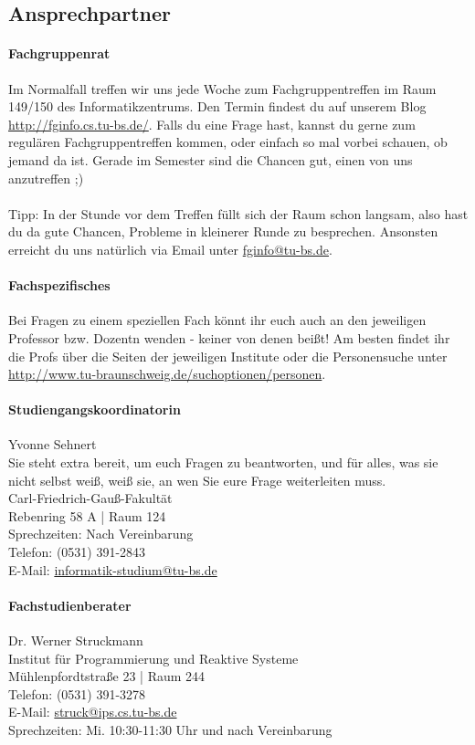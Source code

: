 \subsection{Ansprechpartner}
	\paragraph{Fachgruppenrat}
		Im Normalfall treffen wir uns jede Woche zum Fachgruppentreffen im Raum 149/150 des Informatikzentrums. Den  Termin findest du auf unserem Blog \url{http://fginfo.cs.tu-bs.de/}. Falls du eine Frage hast, kannst du gerne zum regulären Fachgruppentreffen kommen, oder einfach so mal vorbei schauen, ob jemand da ist. Gerade im Semester sind die Chancen gut, einen von uns anzutreffen ;) \\\\
		Tipp: In der Stunde vor dem Treffen füllt sich der Raum schon langsam, also hast du da gute Chancen, Probleme in kleinerer Runde zu besprechen. Ansonsten erreicht du uns natürlich via Email unter \url{fginfo@tu-bs.de}. 

	\paragraph{Fachspezifisches}
		Bei Fragen zu einem speziellen Fach könnt ihr euch auch an den jeweiligen Professor bzw. Dozentn wenden - keiner von denen beißt! Am besten findet ihr die Profs über die Seiten der jeweiligen Institute oder die Personensuche unter \url{http://www.tu-braunschweig.de/suchoptionen/personen}.

	\paragraph{Studiengangskoordinatorin}
		Yvonne Sehnert \\
		Sie steht extra bereit, um euch Fragen zu beantworten, und für alles, was sie nicht selbst weiß, weiß sie, an wen Sie eure Frage weiterleiten muss.\\
		Carl-Friedrich-Gauß-Fakultät\\
		Rebenring 58 A | Raum 124\\
		Sprechzeiten: Nach  Vereinbarung\\
		Telefon: (0531) 391-2843\\
		E-Mail: \url{informatik-studium@tu-bs.de}

	\paragraph{Fachstudienberater}
		Dr. Werner Struckmann\\
		Institut für Programmierung und Reaktive Systeme\\
		Mühlenpfordtstraße 23 | Raum 244\\
		Telefon: (0531) 391-3278\\
		E-Mail: \url{struck@ips.cs.tu-bs.de}\\
		Sprechzeiten: Mi. 10:30-11:30 Uhr und nach  Vereinbarung

